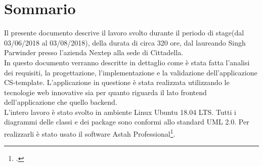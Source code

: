 
\cleardoublepage
{}
{}
\begingroup
\let\clearpage\relax
\let\cleardoublepage\relax
\let\cleardoublepage\relax

\chapter*{Sommario}
Il presente documento descrive il lavoro svolto durante il periodo di stage(dal 03/06/2018 al 03/08/2018), della durata di circa 320 ore, dal laureando Singh Parwinder presso l'azienda Nextep alla sede di Cittadella.
\\
In questo documento verranno descritte in dettaglio come è stata fatta  l'analisi dei requisiti, la progettazione, l'implementazione e la validazione dell'applicazione CS-template. L'applicazione in questione è stata realizzata utilizzando le tecnologie web innovative sia per quanto riguarda il lato frontend dell'applicazione che quello backend.\\
L'intero lavoro è stato svolto in ambiente Linux Ubuntu 18.04 LTS. Tutti i diagrammi delle classi e dei package sono conformi allo standard \gls{UML} 2.0. Per realizzarli è stato usato il software Astah
Professional\footcite{http://astah.net/editions/professional}.  

%
%


